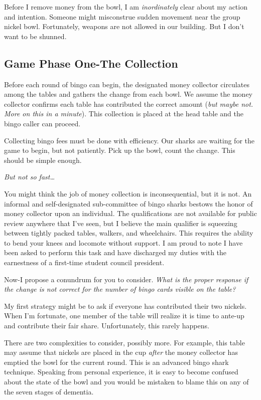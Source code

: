 \documentclass[
  letterpaper,
  DIV=11,
  numbers=noendperiod]{scrartcl}
\begin{document}
Before I remove money from the bowl, I am \emph{inordinately} clear
about my action and intention. Someone might misconstrue sudden movement
near the group nickel bowl. Fortunately, weapons are not allowed in our
building. But I don't want to be shunned.

\hypertarget{game-phase-one-the-collection}{%
\subsection{Game Phase One-The
Collection}\label{game-phase-one-the-collection}}

Before each round of bingo can begin, the designated money collector
circulates among the tables and gathers the change from each bowl. We
assume the money collector confirms each table has contributed the
correct amount (\emph{but maybe not. More on this in a minute}). This
collection is placed at the head table and the bingo caller can proceed.

Collecting bingo fees must be done with efficiency. Our sharks are
waiting for the game to begin, but not patiently. Pick up the bowl,
count the change. This should be simple enough.

\emph{But not so fast\ldots{}}

You might think the job of money collection is inconsequential, but it
is not. An informal and self-designated sub-committee of bingo sharks
bestows the honor of money collector upon an individual. The
qualifications are not available for public review anywhere that I've
seen, but I believe the main qualifier is squeezing between tightly
packed tables, walkers, and wheelchairs. This requires the ability to
bend your knees and locomote without support. I am proud to note I have
been asked to perform this task and have discharged my duties with the
earnestness of a first-time student council president.

Now-I propose a conundrum for you to consider. \emph{What is the proper
response if the change is not correct for the number of bingo cards
visible on the table?}

My first strategy might be to ask if everyone has contributed their two
nickels. When I'm fortunate, one member of the table will realize it is
time to ante-up and contribute their fair share. Unfortunately, this
rarely happens.

There are two complexities to consider, possibly more. For example, this
table may assume that nickels are placed in the cup \emph{after} the
money collector has emptied the bowl for the current round. This is an
advanced bingo shark technique. Speaking from personal experience, it is
easy to become confused about the state of the bowl and you would be
mistaken to blame this on any of the seven stages of dementia.
\end{document}
